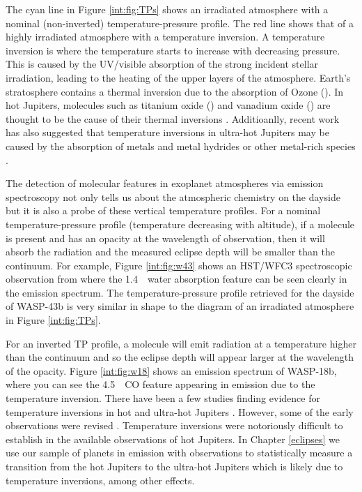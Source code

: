 The cyan line in Figure \ref{int:fig:TPs} shows an irradiated atmosphere with a nominal (non-inverted) temperature-pressure profile. The red line shows that of a highly irradiated atmosphere with a temperature inversion. A temperature inversion is where the temperature starts to increase with decreasing pressure. This is caused by the UV/visible absorption of the strong incident stellar irradiation, leading to the heating of the upper layers of the atmosphere. Earth's stratosphere contains a thermal inversion due to the absorption of Ozone (). In hot Jupiters, molecules such as titanium oxide () and vanadium oxide () are thought to be the cause of their thermal inversions \citep{Hubeny2003, Fortney2008, Desert2008}. Additioanlly, recent work has also suggested that temperature inversions in ultra-hot Jupiters may be caused by the absorption of metals and metal hydrides \citep[Fe, Mg, SiO][]{Lothringer2018} or other metal-rich species \citep[AlO, CaO, NaH and MgH;][]{Gandhi2019}.

The detection of molecular features in exoplanet atmospheres via emission spectroscopy not only tells us about the atmospheric chemistry on the dayside but it is also a probe of these vertical temperature profiles. For a nominal temperature-pressure profile (temperature decreasing with altitude), if a molecule is present and has an opacity at the wavelength of observation, then it will absorb the radiation and the measured eclipse depth will be smaller than the continuum. For example, Figure \ref{int:fig:w43} shows an HST/WFC3 spectroscopic observation from \citet{Stevenson2014c} where the 1.4~\um~water absorption feature can be seen clearly in the emission spectrum. The temperature-pressure profile retrieved for the dayside of WASP-43b is very similar in shape to the diagram of an irradiated atmosphere in Figure \ref{int:fig:TPs}.

For an inverted TP profile, a molecule will emit radiation at a temperature higher than the continuum and so the eclipse depth will appear larger at the wavelength of the opacity. Figure \ref{int:fig:w18} shows an emission spectrum of WASP-18b, where you can see the 4.5~\um~CO feature appearing in emission due to the temperature inversion. There have been a few studies finding evidence for temperature inversions in hot and ultra-hot Jupiters \citep[e.g.,][]{Knutson2008,Knutson2009b,Madhusudhan2010,Haynes2015,Evans2017,Arcangeli2018}. However, some of the early observations were revised \citep[e.g.,][]{Diamond-Lowe2014}. Temperature inversions were notoriously difficult to establish in the available observations of hot Jupiters. In Chapter \ref{eclipses} we use our sample of planets in emission with \spitzerIRAC observations to statistically measure a transition from the hot Jupiters to the ultra-hot Jupiters which is likely due to temperature inversions, among other effects.

